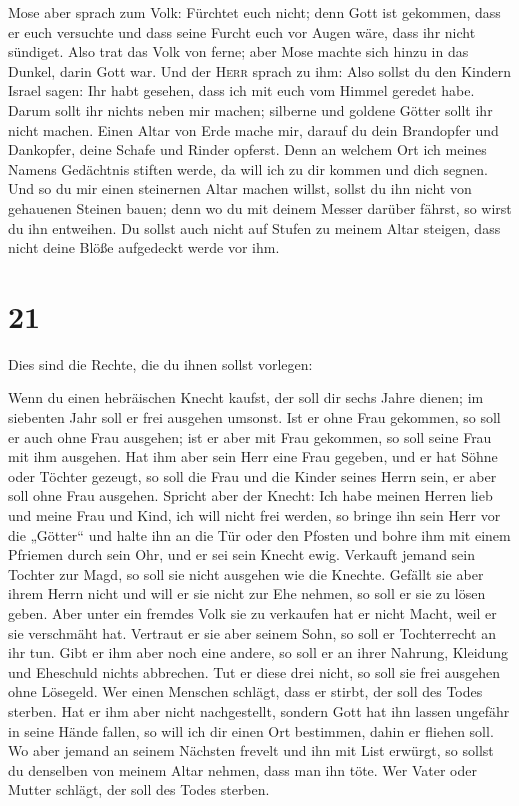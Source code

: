  Mose aber sprach zum Volk: Fürchtet euch nicht; denn
Gott ist gekommen, dass er euch versuchte und dass seine Furcht euch vor
Augen wäre, dass ihr nicht sündiget.  Also trat das Volk
von ferne; aber Mose machte sich hinzu in das Dunkel, darin Gott war.
 Und der \textsc{Herr} sprach zu ihm: Also sollst du den
Kindern Israel sagen: Ihr habt gesehen, dass ich mit euch vom Himmel
geredet habe.  Darum sollt ihr nichts neben mir machen;
silberne und goldene Götter sollt ihr nicht machen. 
Einen Altar von Erde mache mir, darauf du dein Brandopfer und Dankopfer,
deine Schafe und Rinder opferst. Denn an welchem Ort ich meines Namens
Gedächtnis stiften werde, da will ich zu dir kommen und dich segnen.
 Und so du mir einen steinernen Altar machen willst,
sollst du ihn nicht von gehauenen Steinen bauen; denn wo du mit deinem
Messer darüber fährst, so wirst du ihn entweihen.  Du
sollst auch nicht auf Stufen zu meinem Altar steigen, dass nicht deine
Blöße aufgedeckt werde vor ihm.

\hypertarget{section-20}{%
\section{21}\label{section-20}}

 Dies sind die Rechte, die du ihnen sollst vorlegen:

 Wenn du einen hebräischen Knecht kaufst, der soll dir
sechs Jahre dienen; im siebenten Jahr soll er frei ausgehen umsonst.
 Ist er ohne Frau gekommen, so soll er auch ohne Frau
ausgehen; ist er aber mit Frau gekommen, so soll seine Frau mit ihm
ausgehen.  Hat ihm aber sein Herr eine Frau gegeben, und
er hat Söhne oder Töchter gezeugt, so soll die Frau und die Kinder
seines Herrn sein, er aber soll ohne Frau ausgehen. 
Spricht aber der Knecht: Ich habe meinen Herren lieb und meine Frau und
Kind, ich will nicht frei werden,  so bringe ihn sein Herr
vor die „Götter`` und halte ihn an die Tür oder den Pfosten und bohre
ihm mit einem Pfriemen durch sein Ohr, und er sei sein Knecht ewig.
 Verkauft jemand sein Tochter zur Magd, so soll sie nicht
ausgehen wie die Knechte.  Gefällt sie aber ihrem Herrn
nicht und will er sie nicht zur Ehe nehmen, so soll er sie zu lösen
geben. Aber unter ein fremdes Volk sie zu verkaufen hat er nicht Macht,
weil er sie verschmäht hat.  Vertraut er sie aber seinem
Sohn, so soll er Tochterrecht an ihr tun.  Gibt er ihm
aber noch eine andere, so soll er an ihrer Nahrung, Kleidung und
Eheschuld nichts abbrechen.  Tut er diese drei nicht, so
soll sie frei ausgehen ohne Lösegeld.  Wer einen Menschen
schlägt, dass er stirbt, der soll des Todes sterben.  Hat
er ihm aber nicht nachgestellt, sondern Gott hat ihn lassen ungefähr in
seine Hände fallen, so will ich dir einen Ort bestimmen, dahin er
fliehen soll.  Wo aber jemand an seinem Nächsten frevelt
und ihn mit List erwürgt, so sollst du denselben von meinem Altar
nehmen, dass man ihn töte.  Wer Vater oder Mutter
schlägt, der soll des Todes sterben.

